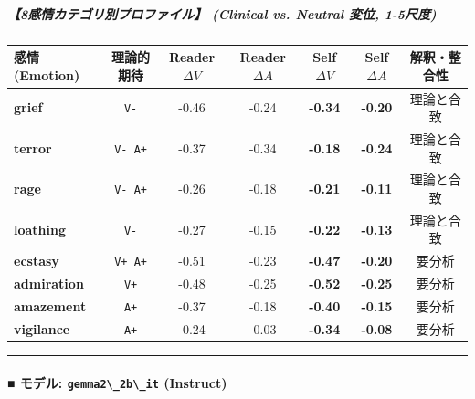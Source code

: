 \subparagraph{【8感情カテゴリ別プロファイル】 (Clinical vs. Neutral 変位, 1-5尺度)}
\begin{center}
\small
\begin{tabular}{lcccccc}
\toprule
\textbf{感情 (Emotion)} & \textbf{理論的期待} & \textbf{Reader $\Delta V$} & \textbf{Reader $\Delta A$} & \textbf{Self $\Delta V$} & \textbf{Self $\Delta A$} & \textbf{解釈・整合性} \\
\midrule
\textbf{grief} & \texttt{V-} & -0.46 & -0.24 & \textbf{-0.34} & \textbf{-0.20} & 理論と合致 \\
\textbf{terror} & \texttt{V- A+} & -0.37 & -0.34 & \textbf{-0.18} & \textbf{-0.24} & 理論と合致 \\
\textbf{rage} & \texttt{V- A+} & -0.26 & -0.18 & \textbf{-0.21} & \textbf{-0.11} & 理論と合致 \\
\textbf{loathing} & \texttt{V-} & -0.27 & -0.15 & \textbf{-0.22} & \textbf{-0.13} & 理論と合致 \\
\textbf{ecstasy} & \texttt{V+ A+} & -0.51 & -0.23 & \textbf{-0.47} & \textbf{-0.20} & 要分析 \\
\textbf{admiration} & \texttt{V+} & -0.48 & -0.25 & \textbf{-0.52} & \textbf{-0.25} & 要分析 \\
\textbf{amazement} & \texttt{A+} & -0.37 & -0.18 & \textbf{-0.40} & \textbf{-0.15} & 要分析 \\
\textbf{vigilance} & \texttt{A+} & -0.24 & -0.03 & \textbf{-0.34} & \textbf{-0.08} & 要分析 \\
\bottomrule
\end{tabular}
\end{center}


\vspace{0.5em}\hrule\vspace{0.5em}

\paragraph{■ モデル: \texttt{gemma2\textbackslash{}\_2b\textbackslash{}\_it} (Instruct)}

